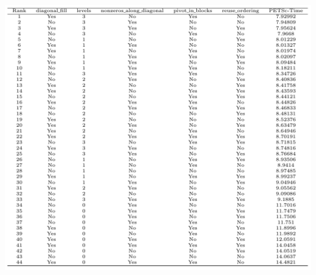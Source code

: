 \documentclass[11pt]{beamer}
\begin{document}
\begin{frame}
\begin{textblock}{6}
    \includegraphics[width=\textwidth]{petsc/options-16x2}
  \end{textblock}


\end{frame}
\end{document}
